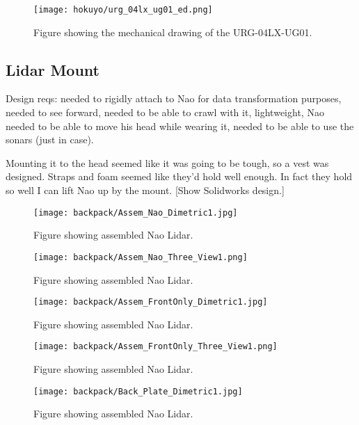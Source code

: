 \begin{figure}
\centering
\texttt{[image: hokuyo/urg\_04lx\_ug01\_ed.png]}
\caption{Figure showing the mechanical drawing of the URG-04LX-UG01.}
\label{fig:lidar_diagram1}
\end{figure}





\clearpage

\subsection{Lidar Mount}
Design reqs: needed to rigidly attach to Nao for data transformation purposes, needed to see forward,
needed to be able to crawl with it, lightweight, Nao needed to be able to move his head while wearing it,
needed to be able to use the sonars (just in case).

Mounting it to the head seemed like it was going to be tough, so a vest was designed.
Straps and foam seemed like they'd hold well enough. In fact they hold so well I can lift Nao up by the mount.
[Show Solidworks design.]
\begin{figure}
\centering
\texttt{[image: backpack/Assem\_Nao\_Dimetric1.jpg]}
\caption{Figure showing assembled Nao Lidar.}
\label{fig:nao_lidar_mount_nao_dimetric1}
\end{figure}

\begin{figure}
\centering
\texttt{[image: backpack/Assem\_Nao\_Three\_View1.png]}
\caption{Figure showing assembled Nao Lidar.}
\label{fig:nao_lidar_mount_nao_three_view1}
\end{figure}

\begin{figure}
\centering
\texttt{[image: backpack/Assem\_FrontOnly\_Dimetric1.jpg]}
\caption{Figure showing assembled Nao Lidar.}
\label{fig:nao_lidar_mount_dimetric1}
\end{figure}

\begin{figure}
\centering
\texttt{[image: backpack/Assem\_FrontOnly\_Three\_View1.png]}
\caption{Figure showing assembled Nao Lidar.}
\label{fig:nao_lidar_mount_three_view1}
\end{figure}

\begin{figure}
\centering
\texttt{[image: backpack/Back\_Plate\_Dimetric1.jpg]}
\caption{Figure showing assembled Nao Lidar.}
\label{fig:nao_lidar_mount_backplate_dimetric1}
\end{figure}

